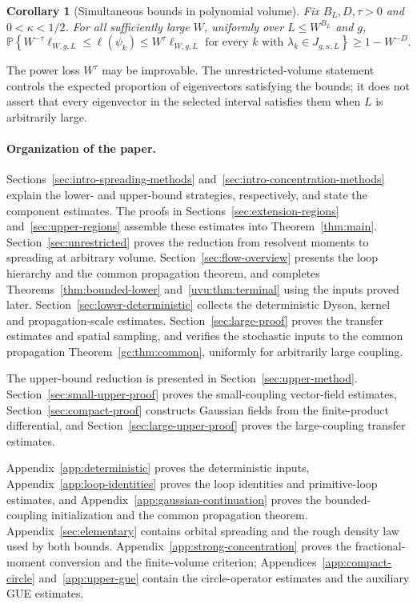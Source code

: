 \documentclass[11pt]{article}
\numberwithin{equation}{section}
\newtheorem{corollary}[theorem]{Corollary}
\theoremstyle{remark}
\newcommand{\Prob}{\mathbb P}
\newcommand{\ellstar}{\ell_{W,g,L}}
\begin{document}
\begin{corollary}[Simultaneous bounds in polynomial volume]
\label{cor:simultaneous}
Fix $B_L,D,\tau>0$ and $0<\kappa<1/2$. For all sufficiently large $W$,
uniformly over $L\le W^{B_L}$ and $g$,
\begin{equation}\label{eq:simultaneous}
 \Prob\left\{
 W^{-\tau}\ellstar\le\ell(\psi_k)\le W^\tau\ellstar
 \text{ for every }k\text{ with }\lambda_k\in J_{g,\kappa,L}
 \right\}\ge1-W^{-D}.
\end{equation}
\end{corollary}


The power loss $W^\tau$ may be improvable. The unrestricted-volume
statement controls the expected proportion of eigenvectors satisfying
the bounds; it does not assert that every eigenvector in the selected
interval satisfies them when $L$ is arbitrarily large.

\paragraph{Organization of the paper.}
Sections~\ref{sec:intro-spreading-methods}
and~\ref{sec:intro-concentration-methods} explain the lower- and
upper-bound strategies, respectively, and state the component estimates.
The proofs in Sections~\ref{sec:extension-regions}
and~\ref{sec:upper-regions} assemble these estimates into
Theorem~\ref{thm:main}.
Section~\ref{sec:unrestricted} proves
the reduction from resolvent moments to spreading at arbitrary volume.
Section~\ref{sec:flow-overview} presents the loop hierarchy and the common
propagation theorem, and completes Theorems~\ref{thm:bounded-lower}
and~\ref{uvu:thm:terminal} using the inputs proved later.
Section~\ref{sec:lower-deterministic} collects the deterministic Dyson,
kernel and propagation-scale estimates.
Section~\ref{sec:large-proof} proves the transfer estimates and spatial
sampling, and verifies the stochastic inputs to the common propagation
Theorem~\ref{gc:thm:common}, uniformly for arbitrarily large coupling.

The upper-bound reduction is presented in Section~\ref{sec:upper-method}.
Section~\ref{sec:small-upper-proof} proves the small-coupling vector-field
estimates, Section~\ref{sec:compact-proof} constructs Gaussian fields from
the finite-product differential, and Section~\ref{sec:large-upper-proof}
proves the large-coupling transfer estimates.

Appendix~\ref{app:deterministic} proves the deterministic inputs,
Appendix~\ref{app:loop-identities} proves the loop identities and
primitive-loop estimates, and Appendix~\ref{app:gaussian-continuation}
proves the bounded-coupling initialization and the common propagation theorem.
Appendix~\ref{sec:elementary} contains orbital spreading and the rough
density law used by both bounds.
Appendix~\ref{app:strong-concentration} proves the fractional-moment
conversion and the finite-volume criterion;
Appendices~\ref{app:compact-circle}
and~\ref{app:upper-gue} contain the circle-operator estimates and the
auxiliary GUE estimates.
\end{document}

